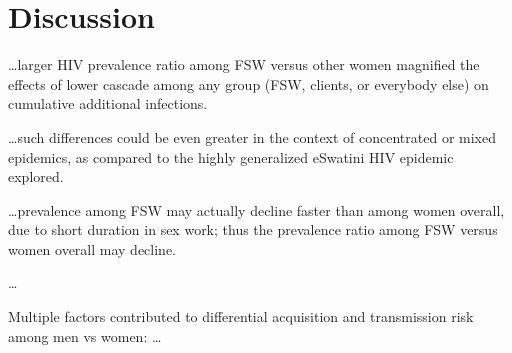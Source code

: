 \section{Discussion}\label{disc}

\dots larger HIV prevalence ratio among FSW versus other women
magnified the effects of lower cascade among any group (FSW, clients, or everybody else)
on cumulative additional infections. %

\dots such differences could be even greater in the context of concentrated or mixed epidemics,
as compared to the highly generalized eSwatini HIV epidemic explored.

\dots prevalence among FSW may actually decline faster than among women overall,
due to short duration in sex work; thus the prevalence ratio among FSW versus women overall may decline.

\dots

Multiple factors contributed to differential acquisition and transmission risk among men vs women:
\dots
